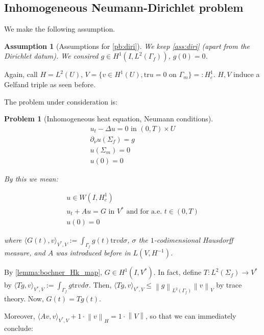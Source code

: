 \documentclass[english,a4paper,12pt,oneside]{scrbook}
\theoremstyle{break}
\newtheorem{ass}[equation]{Assumption}
\newtheorem{pb}[equation]{Problem}
\theoremstyle{remark}
\newcommand{\norm}[1]{\left\lVert#1\right\rVert}
\newcommand{\HN}[1]{\norm{#1}_{H}}
\newcommand{\VN}[1]{\norm{#1}_{V}}
\newcommand{\tr}{\text{tr}}
\begin{document}
\subsection{Inhomogeneous Neumann-Dirichlet problem}

We make the following assumption.

\begin{ass}[Assumptions for \cref{pb:diri}]
\label{ass:neu}
We keep \cref{ass:diri} (apart from the Dirichlet datum). We consired $g \in H^1(I, L^2(\Gamma_f))$, $g(0)=0$.
\end{ass}

Again, call $H=L^2(U)$, $V=\{ v \in H^1(U), \tr u = 0 \text{ on } \Gamma_m\}=:H^1_c$. $H,V$ induce a Gelfand triple as seen before. 


The problem under consideration is:

\begin{pb}[Inhomogeneous heat equation, Neumann conditions]
\label{pb:neu}
\begin{align}
u_t - \Delta u = 0 \text{ in } (0,T)\times U\\
\partial_\nu u(\Sigma_f)=g\\
u(\Sigma_m)=0\\
u(0)=0
\end{align}

By this we mean:

\begin{align}
u \in W(I,H^1_c) \\
u_t + A u = G \text{ in } V^* \text{ and for a.e. } t \in (0,T) \\
u(0)=0
\end{align}

where $\langle G(t), v \rangle_{V^*,V}:=\int_{\Gamma_f} g(t)\tr v d\sigma$, $\sigma$ the $1$-codimensional Hausdorff measure, and $A$ was introduced before in $L(V,H^{-1})$.

\end{pb}

By \cref{lemma:bochner_Hk_map}, $G \in H^1(I,V^*)$. In fact, define $T: L^2(\Sigma_f)\rightarrow V^*$ by $\langle Tg,v \rangle_{V^*,V}:=\int_{\Gamma_f} g\tr v d\sigma$. Then, $\langle Tg,v \rangle_{V^*,V} \leq \norm{g}_{L^2(\Gamma_f)} \VN{v}$ by trace theory. Now, $G(t)=Tg(t)$.

Moreover, $\langle A v, v \rangle_{V^*,V}+ 1 \cdot \HN{v} = 1\cdot \norm{V}$, so that we can immediately conclude:
\end{document}
